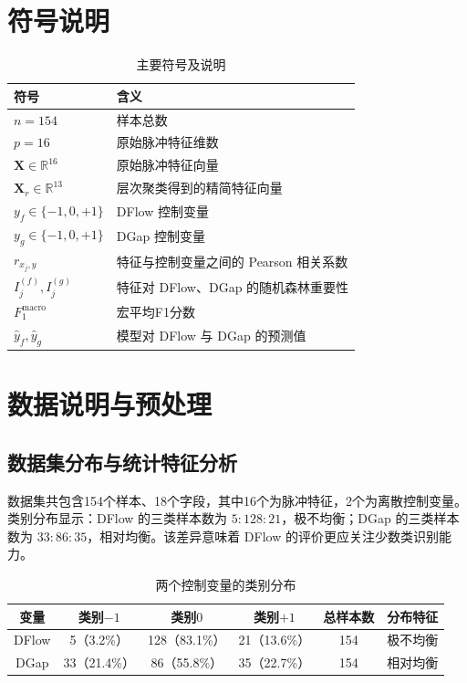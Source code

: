 \documentclass[UTF8,a4paper,12pt]{ctexart}
\begin{document}
\section{符号说明}

\begin{table}[H]
\centering
\caption{主要符号及说明}
\label{tab:symbols}
\setlength{\extrarowheight}{5pt}
\begin{tabular}{>{\centering\arraybackslash}p{4.5cm}p{9.5cm}}
\toprule
符号 & 含义 \\
\midrule
$n=154$ & 样本总数 \\
$p=16$ & 原始脉冲特征维数 \\
$\bm{X}\in\mathbb{R}^{16}$ & 原始脉冲特征向量 \\
$\bm{X}_{r}\in\mathbb{R}^{13}$ & 层次聚类得到的精简特征向量 \\
$y_f\in\{-1,0,+1\}$ & DFlow 控制变量 \\
$y_g\in\{-1,0,+1\}$ & DGap 控制变量 \\
$r_{x_j,y}$ & 特征与控制变量之间的 Pearson 相关系数 \\
$I_j^{(f)},I_j^{(g)}$ & 特征对 DFlow、DGap 的随机森林重要性 \\
$F_1^{\text{macro}}$ & 宏平均F1分数 \\
$\hat y_f,\hat y_g$ & 模型对 DFlow 与 DGap 的预测值 \\
\bottomrule
\end{tabular}
\end{table}

\section{数据说明与预处理}

\subsection{数据集分布与统计特征分析}

数据集共包含154个样本、18个字段，其中16个为脉冲特征，2个为离散控制变量。类别分布显示：DFlow 的三类样本数为 $5:128:21$，极不均衡；DGap 的三类样本数为 $33:86:35$，相对均衡。该差异意味着 DFlow 的评价更应关注少数类识别能力。

\begin{table}[H]
\centering
\caption{两个控制变量的类别分布}
\label{tab:dist}
\begin{tabular}{cccccc}
\toprule
变量 & 类别$-1$ & 类别$0$ & 类别$+1$ & 总样本数 & 分布特征 \\
\midrule
DFlow & 5（3.2\%） & 128（83.1\%） & 21（13.6\%） & 154 & 极不均衡 \\
DGap  & 33（21.4\%） & 86（55.8\%） & 35（22.7\%） & 154 & 相对均衡 \\
\bottomrule
\end{tabular}
\end{table}
\end{document}

